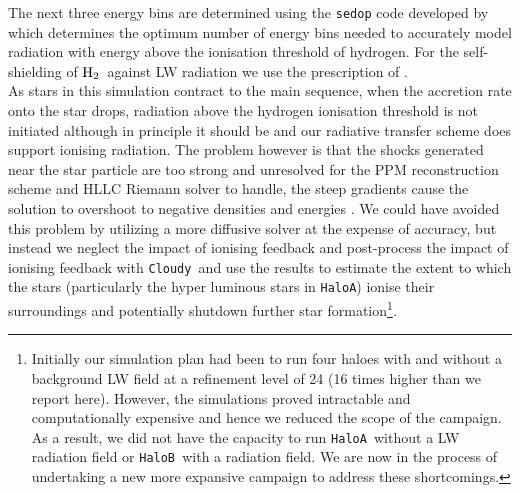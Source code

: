 \documentclass[twocolumn,iop,revtex4]{openjournal}
\newcommand{\cloudy}{\texttt{Cloudy~}}
\newcommand{\molH} {$\rm{H_2}$~}
\newcommand{\ha} {\texttt{HaloA~}}
\newcommand{\hb} {\texttt{HaloB~}}
\newcommand{\hac} {\texttt{HaloA}}
\begin{document}
The next three energy bins are determined using the \texttt{sedop} code developed by
\cite{Mirocha_2012} which determines the optimum number of energy bins needed to
accurately model radiation with energy above the ionisation threshold of hydrogen. For the
self-shielding of \molH against LW radiation we use the prescription of \cite{Wolcott-Green_2011}.\\
\indent As stars in this simulation contract to the main sequence, when the accretion rate onto the
star drops, radiation above the hydrogen ionisation threshold is not initiated although in
principle it should be and our radiative transfer scheme does support ionising radiation. The
problem however is that the shocks generated near
the star particle are too strong and unresolved for the PPM reconstruction scheme and HLLC Riemann
solver to handle, the steep gradients cause the solution to overshoot to negative densities and
energies \citep[see][for details]{Enzo_2014}. We could have avoided this problem by utilizing a more
diffusive solver at the expense of accuracy, but instead
we neglect the impact of ionising feedback and post-process the impact of
ionising feedback with \cloudy and use the results to estimate the extent to which the stars
(particularly the hyper luminous stars in \hac) ionise their surroundings and potentially shutdown
further star formation\footnote{Initially our simulation plan had been to run four haloes with
  and without a background LW field at a refinement level of 24 (16 times higher than we report
  here). However, the simulations proved intractable and computationally expensive and hence we
  reduced the scope of the campaign. As a result, we did not have the capacity to run
    \ha without a LW radiation field or \hb with a radiation field.
  We are now in the process of undertaking a new
  more expansive campaign to address these shortcomings.}.
 
\end{document}

